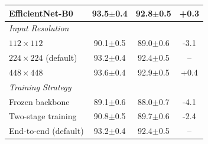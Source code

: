 \begin{table}[t]
\begin{tabularx}{\textwidth}{Xccc}
\quad EfficientNet-B0 & 93.5$\pm$0.4 & 92.8$\pm$0.5 & +0.3 \\
\hline
\multicolumn{4}{l}{\textit{Input Resolution}} \\
\quad $112 \times 112$ & 90.1$\pm$0.5 & 89.0$\pm$0.6 & -3.1 \\
\quad $224 \times 224$ (default) & 93.2$\pm$0.4 & 92.4$\pm$0.5 & -- \\
\quad $448 \times 448$ & 93.6$\pm$0.4 & 92.9$\pm$0.5 & +0.4 \\
\hline
\multicolumn{4}{l}{\textit{Training Strategy}} \\
\quad Frozen backbone & 89.1$\pm$0.6 & 88.0$\pm$0.7 & -4.1 \\
\quad Two-stage training & 90.8$\pm$0.5 & 89.7$\pm$0.6 & -2.4 \\
\quad End-to-end (default) & 93.2$\pm$0.4 & 92.4$\pm$0.5 & -- \\
\hline
\end{tabularx}
\end{table}